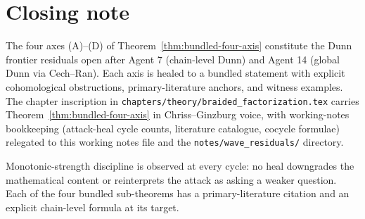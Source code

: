 \documentclass[11pt]{article}
\begin{document}
\section{Closing note}
\label{sec:closing-note}

The four axes (A)--(D) of Theorem~\ref{thm:bundled-four-axis} constitute
the Dunn frontier residuals open after Agent 7 (chain-level Dunn) and
Agent 14 (global Dunn via Cech--Ran). Each axis is healed to a bundled
statement with explicit cohomological obstructions, primary-literature
anchors, and witness examples. The chapter inscription in
\texttt{chapters/theory/braided\_factorization.tex} carries
Theorem~\ref{thm:bundled-four-axis} in Chriss--Ginzburg voice, with
working-notes bookkeeping (attack-heal cycle counts, literature
catalogue, cocycle formulae) relegated to this working notes file and
the \texttt{notes/wave\_residuals/} directory.

Monotonic-strength discipline is observed at every cycle: no heal
downgrades the mathematical content or reinterprets the attack as
asking a weaker question. Each of the four bundled sub-theorems has a
primary-literature citation and an explicit chain-level formula at
its target.
\end{document}
